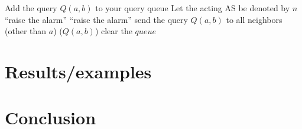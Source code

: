 \documentclass[12pt]{article}
\begin{document}
  \begin{algorithmic}
        \State Add the query $Q(a,b)$ to your query queue
      \EndFor
    \EndFunction
      \State Let the acting AS be denoted by $n$
        \State \Return
      \EndIf
          \State \Return
        \Else
          \State ``raise the alarm''
        \EndIf
      \Else
          \State ``raise the alarm''
        \Else
        \State send the query $Q(a,b)$ to all neighbors (other than $a$)
        \EndIf
      \EndIf
    \EndFunction
        ($Q(a,b)$)
      \EndFor
      \State clear the $queue$
    \EndFunction

  \end{algorithmic}

\begin{comment}
We can put all the details of the protocol implementation here

  One subtlety to note: the ASes should maybe start out by asking
  \emph{themselves} whatever next-hop queries they have. E.g. in {\sc GrandMa},
  node $a$ can immediately tell that $m$ isn't telling the truth,
  because $m$ says he forwards traffic to $a$, but doesn't.
    
\end{comment}

\section{Results/examples}
\begin{comment}
Can you add whichever theorems you think would be worth discussing in the body of the paper? We can then also add some example graphs to highlight these theorems and to contrast with path verification (either in this or a new or the previous section).
\end{comment}

\section{Conclusion}
\begin{comment}
Still need to decide what we should put here.
\end{comment}
\end{document}
